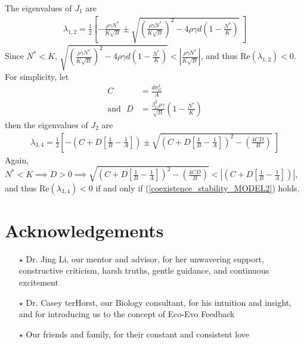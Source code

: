 \documentclass{amsart}
\theoremstyle{definition}
\theoremstyle{remark}
\numberwithin{equation}{section}
\begin{document}
The eigenvalues of $J_1$ are
\begin{align*}
	\lambda_{1,2} = \frac{1}{2}\left[-\frac{\rho\gamma N^*}{K\sqrt{B}} \pm \sqrt{\left(\frac{\rho\gamma N^*}{K\sqrt{B}}\right)^2 - 4\rho\gamma d\left(1 - \frac{N^*}{K}\right)}\ \right]
\end{align*}
Since $N^* < K$, $\sqrt{\left(\frac{\rho\gamma N^*}{K\sqrt{B}}\right)^2 - 4\rho\gamma d\left(1 - \frac{N^*}{K}\right)} < \left|\frac{\rho\gamma N^*}{K\sqrt{B}}\right|$, and thus $\text{Re}(\lambda_{1,2}) < 0$. \\

\noindent For simplicity, let
\begin{align*}
	C &= \frac{d\sigma_G^2}{A} \\
	\text{and} \ \ \ D &= \frac{\beta_G^2\rho\gamma}{\sqrt{B}}\left(1 - \frac{N^*}{K}\right)
\end{align*}
then the eigenvalues of $J_2$ are
\begin{align*}
	\lambda_{3,4} = \frac{1}{2}\left[-\left(C + D\left[\frac{1}{B} - \frac{1}{A} \right]\right) \pm \sqrt{\left(C + D\left[\frac{1}{B} - \frac{1}{A} \right]\right)^2 - \left(\frac{4CD}{B}\right)}\ \right]
\end{align*}
Again, $N^* < K \implies D > 0 \implies \sqrt{\left(C + D\left[\frac{1}{B} - \frac{1}{A} \right]\right)^2 - \left(\frac{4CD}{B}\right)} < \left|\left(C + D\left[\frac{1}{B} - \frac{1}{A} \right]\right)\right|$, and thus $\text{Re}(\lambda_{3,4}) < 0$ if and only if (\ref{coexistence_stability_MODEL2}) holds.


\pagebreak
\section{Acknowledgements}
\begin{itemize}
	\item[$\star$] Dr. Jing Li, our mentor and advisor, for her unwavering support, constructive criticism, harsh truths, gentle guidance, and continuous excitement
	\item[$\star$] Dr. Casey terHorst, our Biology consultant, for his intuition and insight, and for introducing us to the concept of Eco-Evo Feedback
	\item[$\star$] Our friends and family, for their constant and consistent love
\end{itemize}
\end{document}
